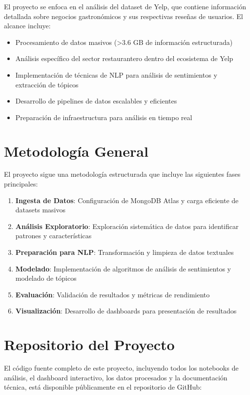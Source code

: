 \documentclass[12pt,a4paper,twoside,openany]{book}
\begin{document}
El proyecto se enfoca en el análisis del dataset de Yelp, que contiene información detallada sobre negocios gastronómicos y sus respectivas reseñas de usuarios. El alcance incluye:

\begin{itemize}
    \item Procesamiento de datos masivos (>3.6 GB de información estructurada)
    \item Análisis específico del sector restaurantero dentro del ecosistema de Yelp
    \item Implementación de técnicas de NLP para análisis de sentimientos y extracción de tópicos
    \item Desarrollo de pipelines de datos escalables y eficientes
    \item Preparación de infraestructura para análisis en tiempo real
\end{itemize}

\section{Metodología General}

El proyecto sigue una metodología estructurada que incluye las siguientes fases principales:

\begin{enumerate}
    \item \textbf{Ingesta de Datos}: Configuración de MongoDB Atlas y carga eficiente de datasets masivos
    \item \textbf{Análisis Exploratorio}: Exploración sistemática de datos para identificar patrones y características
    \item \textbf{Preparación para NLP}: Transformación y limpieza de datos textuales
    \item \textbf{Modelado}: Implementación de algoritmos de análisis de sentimientos y modelado de tópicos
    \item \textbf{Evaluación}: Validación de resultados y métricas de rendimiento
    \item \textbf{Visualización}: Desarrollo de dashboards para presentación de resultados
\end{enumerate}

\section{Repositorio del Proyecto}

El código fuente completo de este proyecto, incluyendo todos los notebooks de análisis, el dashboard interactivo, los datos procesados y la documentación técnica, está disponible públicamente en el repositorio de GitHub:
\end{document}
